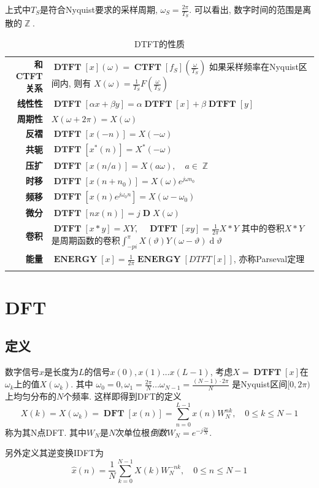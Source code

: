 \documentclass{ctexart}
\DeclareMathOperator{\CTFT}{\mathbf{CTFT}}
\DeclareMathOperator{\DTFT}{\mathbf{DTFT}}
\DeclareMathOperator{\DFT}{\mathbf{DFT}}
\DeclareMathOperator{\ENERGY}{\mathbf{ENERGY}}
\DeclareMathOperator{\D}{\mathbf{D}}
\DeclareMathOperator{\ud}{\mathrm{d}}
\DeclareMathOperator{\Zset}{\mathbb{Z}}
\newlength{\Oldarrayrulewidth}
\newcommand{\Hline}[1]{
  \noalign{\global\setlength{\Oldarrayrulewidth}{\arrayrulewidth}}
  \noalign{\global\setlength{\arrayrulewidth}{#1}}\hline
  \noalign{\global\setlength{\arrayrulewidth}{\Oldarrayrulewidth}}}
\newcommand{\Topline}{\Hline{0.08em}}
\newcommand{\Bottomline}{\Hline{0.08em}}
\begin{document}
    上式中$T_S$是符合Nyquist要求的采样周期, $\omega_S = \frac{2\pi}{T_S}$.
    可以看出, 数字时间的范围是离散的$\Zset$.

    \begin{table}[ht!]
    \begin{tabularx}{\textwidth}{|>{\bfseries}r  L|}
        \Topline
        和CTFT关系 & $\displaystyle \DTFT[x](\omega) = \CTFT[f_S](\frac{\omega}{T_S})$
            如果采样频率在Nyquist区间内, 则有 $X(\omega) = \frac{1}{T_S} F\left(\frac{\omega}{T_S}\right)$\\
        线性性 & $\displaystyle \DTFT[\alpha x + \beta y] = \alpha \DTFT[x] + \beta \DTFT[y]$\\
        周期性 & $\displaystyle X(\omega + 2\pi) = X(\omega)$\\
        反褶 & $\displaystyle \DTFT[x(-n)] = X(-\omega)$\\
        共轭 & $\displaystyle \DTFT[x^*(n)] = X^*(-\omega)$\\
        压扩 & $\displaystyle \DTFT[x(n/a)] = X(a\omega), \quad a \in \Zset$\\
        时移 & $\displaystyle \DTFT[x(n + n_0)] = X(\omega) e^{j \omega n_0}$\\
        频移 & $\displaystyle \DTFT[x(n) e^{j \omega_0 n}] = X(\omega - \omega_0)$\\
        微分 & $\displaystyle \DTFT[nx(n)] = j \D X(\omega)$\\
        卷积 & $\displaystyle \DTFT[x * y] = X Y,\quad \DTFT[x y] = \frac{1}{2\pi} X * Y$
            其中的卷积$X * Y$是周期函数的卷积$\int_{-pi}^{\pi} X(\vartheta) Y(\omega - \vartheta) \ud \vartheta$\\
        能量 & $\displaystyle \ENERGY[x] = \frac{1}{2\pi} \ENERGY[DTFT[x]]$, 亦称Parseval定理\\
        \Bottomline
    \end{tabularx}
    \caption{DTFT的性质}
    \end{table}

\clearpage

\section{DFT}
\subsection{定义}
    数字信号$x$是长度为$L$的信号$x(0), x(1) \ldots x(L - 1)$,
    考虑$X = \DTFT[x]$在$\omega_k$上的值$X(\omega_k)$. 其中
    $\omega_0 = 0, \omega_1 = \frac{2\pi}{N} \ldots \omega_{N - 1} = \frac{(N-1) \cdot 2\pi}{N}$
    是Nyquist区间$[0, 2\pi)$上均匀分布的$N$个频率. 这样即得到DFT的定义
    \[
        X(k) = X(\omega_k) = \DFT[x(n)] = \sum_{n = 0}^{L - 1} x(n) W_N^{nk},\quad 0 \le k \le N - 1\]
    称为其N点DFT. 其中$W_N$是$N$次单位根\emph{倒数}$W_N = e^{- j \frac{2 \pi}{N}}$.\par
    另外定义其逆变换IDFT为\[
        \hat{x}(n) = \frac{1}{N} \sum_{k = 0}^{N - 1} X(k) W_N^{-nk},\quad 0 \le n  \le N -1 \]
\end{document}
